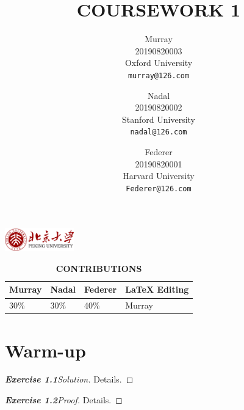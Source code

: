 \documentclass{article}
\title{\bfseries COURSEWORK 1}
\author{
	Murray\\
	20190820003\\
	Oxford University\\
	\texttt{murray@126.com}
	\and
	Nadal\\
	20190820002\\
	Stanford University\\
	\texttt{nadal@126.com}
	\and
	Federer\\
	20190820001\\
	Harvard University\\
	\texttt{Federer@126.com}
}%
\begin{document}
\noindent\includegraphics[height=1cm]{pku.png}\hfill{\raisebox{.41\baselineskip}{\textcolor{pkured}{\bfseries\scshape Mathematical Logic in 2018 Fall}}}
{\let\newpage\relax\maketitle}



\thispagestyle{fancy}
\fancyhead{}


\pagestyle{fancy}
\fancyhead{}


\begin{table}[h]
\renewcommand\arraystretch{1.3}
\caption*{\bfseries\color{pkured} CONTRIBUTIONS}
\centering
\color{pkured}
\begin{tabular}{p{2cm}<{\centering}p{2cm}<{\centering}p{2cm}<{\centering}|p{3cm}<{\centering}}
\hline
Murray & Nadal & Federer & \LaTeX{} Editing\\\hline
30\% & 30\% & 40\% & Murray \\\hline
\end{tabular}
\end{table}

\par\vskip 30pt 

\section*{Warm-up}
\begin{proof}[{\upshape\bfseries Exercise 1.1}\quad Solution]
Details.
\end{proof}

\begin{proof}[{\upshape\bfseries Exercise 1.2}\quad Proof]
Details.
\end{proof}
\end{document}
